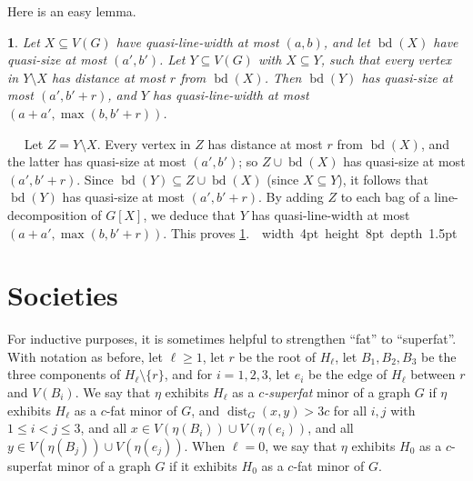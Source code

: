 \documentclass[titlepage,11pt]{article}
\newcommand\blackslug{\hbox{\hskip 1pt \vrule width 4pt height 8pt depth 1.5pt
		\hskip 1pt}}
\newcommand\bbox{\hfill \quad \blackslug \bigbreak}
\newcommand{\dist}{\operatorname{dist}}
\newcommand{\bd}{\operatorname{bd}}
\newtheorem{thm}{}[section]
\newcommand{\Proof}{\noindent{\bf Proof.}\ \ }
\begin{document}
	Here is an easy lemma.
	\begin{thm}\label{increaserad}
		Let $X\subseteq V(G)$ have quasi-line-width at most $(a,b)$, and let $\bd(X)$ have quasi-size at most $(a',b')$. Let 
		$Y\subseteq V(G)$ with $X\subseteq Y$, such that every vertex in $Y\setminus X$ has distance at most $r$ from $\bd(X)$. Then $\bd(Y)$ has quasi-size at
		most $(a',b'+r)$, and $Y$ has quasi-line-width at most $(a+a',\max(b,b'+r))$.
	\end{thm}
	\Proof
	Let $Z=Y\setminus X$. Every vertex in $Z$ has distance at most $r$ from $\bd (X)$, and the latter has quasi-size at most $(a',b')$;
	so $Z\cup \bd (X)$ has quasi-size at most $(a',b'+r)$. Since $\bd (Y)\subseteq Z\cup \bd (X)$ (since $X\subseteq Y$), it follows that $\bd(Y)$ has quasi-size at
	most $(a',b'+r)$. By adding $Z$ to each bag of a line-decomposition of $G[X]$, we deduce that $Y$ has quasi-line-width at most 
	$(a+a',\max(b,b'+r))$. This proves \ref{increaserad}.~\bbox
	\section{Societies}
	
	For inductive purposes, it is sometimes helpful to strengthen ``fat'' to ``superfat''.
	With notation as before, let $\ell\ge 1$, let $r$ be the root of $H_\ell$,
	let $B_1,B_2,B_3$ be the three components of $H_\ell\setminus \{r\}$, and for $i = 1,2,3$, let $e_i$ be the edge of $H_\ell$ between
	$r$ and $V(B_i)$. We say that $\eta$ exhibits
	$H_\ell$ as a {\em $c$-superfat} minor of a graph $G$ if $\eta$ exhibits $H_\ell$ as a $c$-fat minor of $G$,
	and $\dist_G(x,y)> 3c$ for all $i,j$ with $1\le i<j\le 3$, and all
	$x\in V(\eta(B_i))\cup V(\eta(e_i))$, and all $y\in  V(\eta(B_j))\cup V(\eta(e_j))$.
	When $\ell=0$, we say that $\eta$ exhibits $H_0$ as a $c$-superfat minor of a graph $G$ if it exhibits $H_0$ as a $c$-fat minor of $G$.
	
\end{document}
